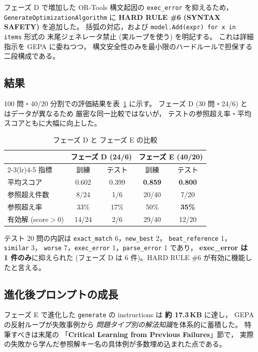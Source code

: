 \documentclass[uplatex,dvipdfmx,a4paper,11pt]{jsarticle}
\begin{document}
フェーズ D で増加した OR-Tools 構文起因の
\texttt{exec\_error} を抑えるため，
\texttt{GenerateOptimizationAlgorithm} に
\textbf{HARD RULE \#6 (SYNTAX SAFETY)} を追加した。
括弧の対応，および
\texttt{model.Add(expr) for x in items} 形式の
末尾ジェネレータ禁止 (実ループを使う) を明記する。
これは詳細指示を GEPA に委ねつつ，
構文安全性のみを最小限のハードルールで担保する二段構成である。

\subsection{結果}

100 問・40/20 分割での評価結果を表~\ref{tab:phaseE} に示す。
フェーズ D (30 問・24/6) とはデータが異なるため
厳密な同一比較ではないが，
テストの参照超え率・平均スコアともに大幅に向上した。

\begin{table}[htbp]
  \centering
  \caption{フェーズ D と フェーズ E の比較}
  \label{tab:phaseE}
  \begin{tabular}{lcccc}
    \toprule
    & \multicolumn{2}{c}{フェーズ D (24/6)} & \multicolumn{2}{c}{フェーズ E (40/20)} \\
    \cmidrule(lr){2-3}\cmidrule(lr){4-5}
    指標 & 訓練 & テスト & 訓練 & テスト \\
    \midrule
    平均スコア & 0.602 & 0.399 & \textbf{0.859} & \textbf{0.800} \\
    参照超え件数 & 8/24 & 1/6 & 20/40 & 7/20 \\
    参照超え率 & 33\% & 17\% & 50\% & \textbf{35\%} \\
    有効解 (score$>$0) & 14/24 & 2/6 & 29/40 & 12/20 \\
    \bottomrule
  \end{tabular}
\end{table}

テスト 20 問の内訳は
\texttt{exact\_match} 6，\texttt{new\_best} 2，
\texttt{beat\_reference} 1，\texttt{similar} 3，
\texttt{worse} 7，\texttt{exec\_error} 1，\texttt{parse\_error} 1 であり，
\textbf{exec\_error は 1 件のみ}に抑えられた
(フェーズ D は 6 件)。HARD RULE \#6 が有効に機能したと言える。

\subsection{進化後プロンプトの成長}

フェーズ E で進化した \texttt{generate} の instructions は
\textbf{約 17.3\,KB} に達し，
GEPA の反射ループが失敗事例から
\emph{問題タイプ別の解法知識}を体系的に蓄積した。
特筆すべきは末尾の
「\textbf{Critical Learning from Previous Failures}」節で，
実際の失敗から学んだ参照解キー名の具体例が多数埋め込まれた点である。
\end{document}
